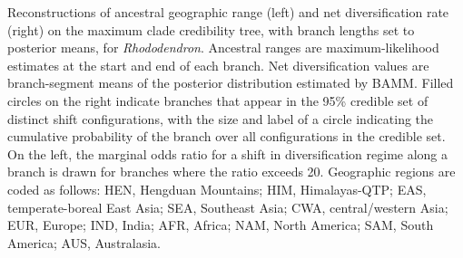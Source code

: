\label{fig:rhododendron}
Reconstructions of ancestral geographic range (left) and net diversification rate (right) on the maximum clade credibility tree, with branch lengths set to posterior means, for \textit{Rhododendron}. Ancestral ranges are maximum-likelihood estimates at the start and end of each branch. Net diversification values are branch-segment means of the posterior distribution estimated by BAMM. Filled circles on the right indicate branches that appear in the 95\% credible set of distinct shift configurations, with the size and label of a circle indicating the cumulative probability of the branch over all configurations in the credible set. On the left, the marginal odds ratio for a shift in diversification regime along a branch is drawn for branches where the ratio exceeds 20. Geographic regions are coded as follows: HEN, Hengduan Mountains; HIM, Himalayas-QTP; EAS, temperate-boreal East Asia; SEA, Southeast Asia; CWA, central/western Asia; EUR, Europe; IND, India; AFR, Africa; NAM, North America; SAM, South America; AUS, Australasia.